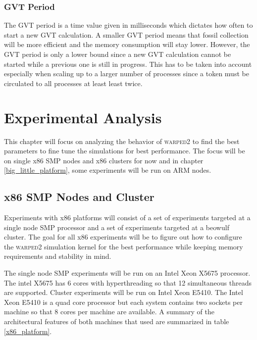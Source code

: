 \documentclass[11pt]{book}
\begin{document}
\subsection{GVT Period}

The GVT period is a time value given in milliseconds which dictates how often to start a new
GVT calculation. A smaller GVT period means that fossil collection will be more efficient and
the memory consumption will stay lower. However, the GVT period is only a lower bound since
a new GVT calculation cannot be started while a previous one is still in progress. This has to
be taken into account especially when scaling up to a larger number of processes since a token
must be circulated to all processes at least least twice.



\chapter{Experimental Analysis}\label{experimental_analysis}

This chapter will focus on analyzing the behavior of \textsc{warped2} to find the best parameters
to fine tune the simulations for best performance. The focus will be on single x86 SMP nodes
and x86 clusters for now and in chapter \ref{big_little_platform}, some experiments will be
run on ARM nodes.

\section{x86 SMP Nodes and Cluster}

Experiments with x86 platforms will consist of a set of experiments targeted at a single node
SMP processor and a set of experiments targeted at a beowulf cluster. The goal for all x86
experiments will be to figure out how to configure the \textsc{warped2} simulation kernel for
the best performance while keeping memory requirements and stability in mind.

The single node SMP experiments will be run on an Intel Xeon X5675 processor. The intel X5675
has 6 cores with hyperthreading so that 12 simultaneous threads are supported.
Cluster experiments will be run on Intel Xeon E5410. The Intel Xeon E5410 is a quad core processor
but each system contains two sockets per machine so that 8 cores per machine are available.
A summary of the architectural features of both machines that used are summarized in table
\ref{x86_platform}.

\pagebreak
\end{document}
